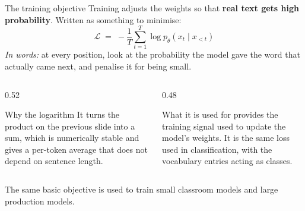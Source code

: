 \documentclass[aspectratio=169,10pt]{beamer}
\begin{document}
\begin{frame}[shrink=12]{The training objective}
  Training adjusts the weights so that \textbf{real text gets high
  probability}. Written as something to minimise:
  \[
    \mathcal{L} \;=\; -\frac{1}{T}\sum_{t=1}^{T}\log p_\theta\!\left(x_t \mid x_{<t}\right)
  \]
  \emph{In words:} at every position, look at the probability the model gave
  the word that actually came next, and penalise it for being small.

  \vspace{0.5em}
  \begin{columns}[T]
    \begin{column}{0.52\textwidth}
      \begin{block}{Why the logarithm}
        \small
        It turns the product on the previous slide into a sum, which is
        numerically stable and gives a per-token average that does not depend
        on sentence length.
      \end{block}
    \end{column}
    \begin{column}{0.48\textwidth}
      \begin{block}{What it is used for}
        \small
         provides the training signal used to update
        the model's weights. It is the same loss used in classification, with
        the vocabulary entries acting as classes.
      \end{block}
    \end{column}
  \end{columns}

  \vfill
  \begin{takeaway}
    The same basic objective is used to train small classroom models and large
    production models.
  \end{takeaway}
\end{frame}
\end{document}
